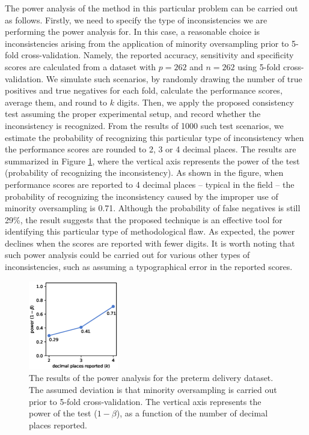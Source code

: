 \documentclass[3p, times]{elsarticle}
\begin{document}
{
    \color{blue}
    The power analysis of the method in this particular problem can be carried out as follows. Firstly, we need to specify the type of inconsistencies we are performing the power analysis for. In this case, a reasonable choice is inconsistencies arising from the application of minority oversampling prior to 5-fold cross-validation. Namely, the reported accuracy, sensitivity and specificity scores are calculated from a dataset with $p=262$ and $n=262$ using 5-fold cross-validation.
    We simulate such scenarios, by randomly drawing the number of true positives and true negatives for each fold, calculate the performance scores, average them, and round to $k$ digits. Then, we apply the proposed consistency test assuming the proper experimental setup, and record whether the inconsistency is recognized. 
    From the results of 1000 such test scenarios, we estimate the probability of recognizing this particular type of inconsistency when the performance scores are rounded to 2, 3 or 4 decimal places. The results are summarized in Figure \ref{fig:powertpehg}, where the vertical axis represents the power of the test (probability of recognizing the inconsistency). As shown in the figure, when performance scores are reported to 4 decimal places -- typical in the field -- the probability of recognizing the inconsistency caused by the improper use of minority oversampling is 0.71. Although the probability of false negatives is still 29\%, the result suggests that the proposed technique is an effective tool for identifying this particular type of methodological flaw. As expected, the power declines when the scores are reported with fewer digits. It is worth noting that such power analysis could be carried out for various other types of inconsistencies, such as assuming a typographical error in the reported scores.
}

\begin{figure}
    \begin{center}
        \includegraphics[width=0.35\textwidth]{power-tpehg.eps}
    \end{center}
    \caption{{\color{blue} The results of the power analysis for the preterm delivery dataset. The assumed deviation is that minority oversampling is carried out prior to 5-fold cross-validation. The vertical axis represents the power of the test ($1 - \beta$), as a function of the number of decimal places reported. %
    }}
    \label{fig:powertpehg}
\end{figure}
\end{document}
